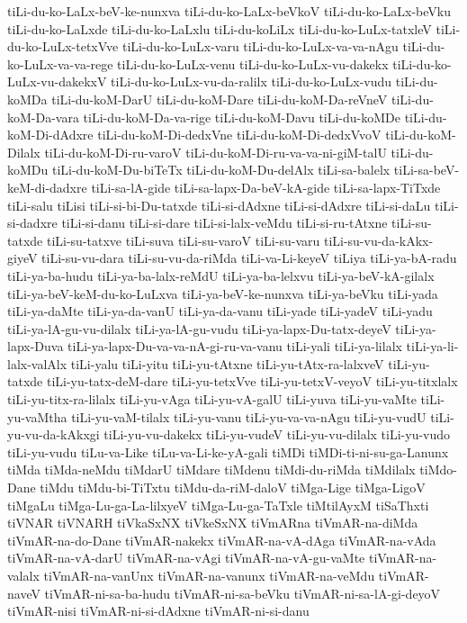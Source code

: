{tiLi-du-ko-LaLx-beV-ke-nunxva
tiLi-du-ko-LaLx-beVkoV
tiLi-du-ko-LaLx-beVku
tiLi-du-ko-LaLxde
tiLi-du-ko-LaLxlu
tiLi-du-koLiLx
tiLi-du-ko-LuLx-tatxleV
tiLi-du-ko-LuLx-tetxVve
tiLi-du-ko-LuLx-varu
tiLi-du-ko-LuLx-va-va-nAgu
tiLi-du-ko-LuLx-va-va-rege
tiLi-du-ko-LuLx-venu
tiLi-du-ko-LuLx-vu-dakekx
tiLi-du-ko-LuLx-vu-dakekxV
tiLi-du-ko-LuLx-vu-da-ralilx
tiLi-du-ko-LuLx-vudu
tiLi-du-koMDa
tiLi-du-koM-DarU
tiLi-du-koM-Dare
tiLi-du-koM-Da-reVneV
tiLi-du-koM-Da-vara
tiLi-du-koM-Da-va-rige
tiLi-du-koM-Davu
tiLi-du-koMDe
tiLi-du-koM-Di-dAdxre
tiLi-du-koM-Di-dedxVne
tiLi-du-koM-Di-dedxVvoV
tiLi-du-koM-Dilalx
tiLi-du-koM-Di-ru-varoV
tiLi-du-koM-Di-ru-va-va-ni-giM-talU
tiLi-du-koMDu
tiLi-du-koM-Du-biTeTx
tiLi-du-koM-Du-delAlx
tiLi-sa-balelx
tiLi-sa-beV-keM-di-dadxre
tiLi-sa-lA-gide
tiLi-sa-lapx-Da-beV-kA-gide
tiLi-sa-lapx-TiTxde
tiLi-salu
tiLisi
tiLi-si-bi-Du-tatxde
tiLi-si-dAdxne
tiLi-si-dAdxre
tiLi-si-daLu
tiLi-si-dadxre
tiLi-si-danu
tiLi-si-dare
tiLi-si-lalx-veMdu
tiLi-si-ru-tAtxne
tiLi-su-tatxde
tiLi-su-tatxve
tiLi-suva
tiLi-su-varoV
tiLi-su-varu
tiLi-su-vu-da-kAkx-giyeV
tiLi-su-vu-dara
tiLi-su-vu-da-riMda
tiLi-va-Li-keyeV
tiLiya
tiLi-ya-bA-radu
tiLi-ya-ba-hudu
tiLi-ya-ba-lalx-reMdU
tiLi-ya-ba-lelxvu
tiLi-ya-beV-kA-gilalx
tiLi-ya-beV-keM-du-ko-LuLxva
tiLi-ya-beV-ke-nunxva
tiLi-ya-beVku
tiLi-yada
tiLi-ya-daMte
tiLi-ya-da-vanU
tiLi-ya-da-vanu
tiLi-yade
tiLi-yadeV
tiLi-yadu
tiLi-ya-lA-gu-vu-dilalx
tiLi-ya-lA-gu-vudu
tiLi-ya-lapx-Du-tatx-deyeV
tiLi-ya-lapx-Duva
tiLi-ya-lapx-Du-va-va-nA-gi-ru-va-vanu
tiLi-yali
tiLi-ya-lilalx
tiLi-ya-li-lalx-valAlx
tiLi-yalu
tiLi-yitu
tiLi-yu-tAtxne
tiLi-yu-tAtx-ra-lalxveV
tiLi-yu-tatxde
tiLi-yu-tatx-deM-dare
tiLi-yu-tetxVve
tiLi-yu-tetxV-veyoV
tiLi-yu-titxlalx
tiLi-yu-titx-ra-lilalx
tiLi-yu-vAga
tiLi-yu-vA-galU
tiLi-yuva
tiLi-yu-vaMte
tiLi-yu-vaMtha
tiLi-yu-vaM-tilalx
tiLi-yu-vanu
tiLi-yu-va-va-nAgu
tiLi-yu-vudU
tiLi-yu-vu-da-kAkxgi
tiLi-yu-vu-dakekx
tiLi-yu-vudeV
tiLi-yu-vu-dilalx
tiLi-yu-vudo
tiLi-yu-vudu
tiLu-va-Like
tiLu-va-Li-ke-yA-gali
tiMDi
tiMDi-ti-ni-su-ga-Lanunx
tiMda
tiMda-neMdu
tiMdarU
tiMdare
tiMdenu
tiMdi-du-riMda
tiMdilalx
tiMdo-Dane
tiMdu
tiMdu-bi-TiTxtu
tiMdu-da-riM-daloV
tiMga-Lige
tiMga-LigoV
tiMgaLu
tiMga-Lu-ga-La-lilxyeV
tiMga-Lu-ga-TaTxle
tiMtilAyxM
tiSaThxti
tiVNAR
tiVNARH
tiVkaSxNX
tiVkeSxNX
tiVmARna
tiVmAR-na-diMda
tiVmAR-na-do-Dane
tiVmAR-nakekx
tiVmAR-na-vA-dAga
tiVmAR-na-vAda
tiVmAR-na-vA-darU
tiVmAR-na-vAgi
tiVmAR-na-vA-gu-vaMte
tiVmAR-na-valalx
tiVmAR-na-vanUnx
tiVmAR-na-vanunx
tiVmAR-na-veMdu
tiVmAR-naveV
tiVmAR-ni-sa-ba-hudu
tiVmAR-ni-sa-beVku
tiVmAR-ni-sa-lA-gi-deyoV
tiVmAR-nisi
tiVmAR-ni-si-dAdxne
tiVmAR-ni-si-danu
}
